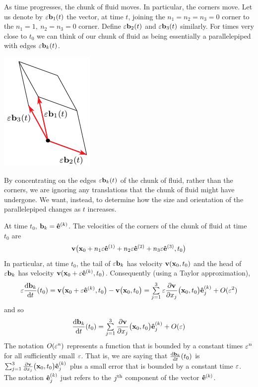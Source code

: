 As time progresses, 
the chunk of fluid moves. In particular, the corners move. Let us denote by 
$\varepsilon\mathbf{b}_1(t)$ the vector, at time $t$,
joining the $n_1=n_2=n_3=0$ corner to the $n_1=1,\
n_2=n_3=0$ corner. Define $\varepsilon\mathbf{b}_2(t)$ and $\varepsilon\mathbf{b}_3(t)$ similarly.
For times very close to $t_0$ we can think of our chunk of fluid as being
essentially a parallelepiped with edges $\varepsilon\mathbf{b}_k(t)$. 
\begin{nfig}
\begin{center}
    \includegraphics{cubeB.pdf}
\end{center}
\end{nfig}
By concentrating on the edges $\varepsilon\mathbf{b}_k(t)$ of the chunk of fluid, rather
than the corners, we are ignoring any translations that the chunk of
fluid might have undergone. We want, instead, to determine
how the size and orientation of the parallelepiped changes  as $t$ increases.

At time $t_0$, $\mathbf{b}_k=\mathbf{\hat e}^{(k)}$.
The velocities  of the corners of the chunk of fluid at time $t_0$ are 
\begin{equation*}
\mathbf{v}\big(\mathbf{x}_0+n_1\varepsilon\mathbf{\hat e}^{(1)}+n_2\varepsilon\mathbf{\hat e}^{(2)}+n_3\varepsilon\mathbf{\hat e}^{(3)},t_0\big)
\end{equation*}
In particular, at time $t_0$, the tail of $\varepsilon\mathbf{b}_k$ has velocity 
$\mathbf{v}(\mathbf{x}_0,t_0)$ and the head of $\varepsilon\mathbf{b}_k$ has velocity 
$\mathbf{v}(\mathbf{x}_0+\varepsilon\mathbf{\hat e}^{(k)},t_0)$. Consequently (using a Taylor approximation), 
\begin{equation*}
\veps\diff{\vb_k}{t}(t_0)=\vv\big(\vx_0+\veps\ha{k},t_0\big)
      -\vv\big(\vx_0,t_0\big)
=\smsum_{j=1}^3\veps\frac{\partial\vv}{\partial x_j}\big(\vx_0,t_0\big)\ha{k}_j
+O(\veps^2)
\end{equation*}
and so
\begin{equation*}
\diff{\vb_k}{t}(t_0)
=\smsum_{j=1}^3\frac{\partial\vv}{\partial x_j}\big(\vx_0,t_0\big)\ha{k}_j
+O(\veps)
\end{equation*}
The notation $O(\varepsilon^n)$ represents a function that is bounded by a constant
times $\varepsilon^n$ for all sufficiently small $\varepsilon$. That is, we are saying that
$\diff{\vb_k}{t}(t_0)$ is 
$\mathop{{\textstyle \sum}}_{j=1}^3\frac{\partial\mathbf{v}}{\partial x_j}\big(\mathbf{x}_0,t_0\big)\mathbf{\hat e}^{(k)}_j$
plus a small error that is bounded by a constant time $\varepsilon$.
The notation $\mathbf{\hat e}^{(k)}_j$
just refers to the $j^{\rm th}$ component of the vector $\mathbf{\hat e}^{(k)}$.

